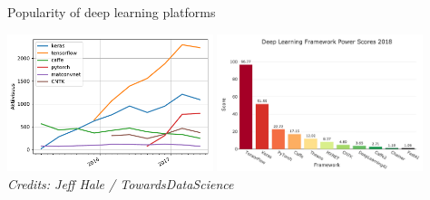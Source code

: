 \documentclass[10pt, aspectratio=169]{beamer} %
\begin{document}
\begin{frame}[fragile]{Popularity of deep learning platforms}
\begin{center}
\includegraphics[width=0.45\textwidth]{deeplearning_issues}
\qquad\includegraphics[width=0.45\textwidth]{popularity}\\
\hspace*{7cm}\emph{\scriptsize Credits: Jeff Hale / TowardsDataScience}
\end{center}
\end{frame}
\end{document}

